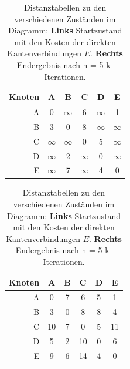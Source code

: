 \documentclass[12pt]{article}
\begin{document}
\begin{table}
\begin{tabular}{r||c|c|c|c|c}
	Knoten&A&B&C&D&E\\ \hline \hline
	A&0&$\infty$&6&$\infty$&1\\
	B&3&0&8&$\infty$&$\infty$\\
	C&$\infty$&$\infty$&0&5&$\infty$\\
	D&$\infty$&2&$\infty$&0&$\infty$\\
	E&$\infty$&7&$\infty$&4&0\\
\end{tabular}
\hspace*{20pt}
\begin{tabular}{r||c|c|c|c|c}
	Knoten&A&B&C&D&E\\ \hline \hline
	A&0&7&6&5&1\\
	B&3&0&8&8&4\\
	C&10&7&0&5&11\\
	D&5&2&10&0&6\\
	E&9&6&14&4&0\\
\end{tabular}
\caption{Distanztabellen zu den verschiedenen Zuständen im Diagramm: \textbf{Links} Startzustand mit den Kosten der direkten Kantenverbindungen $E$. \textbf{Rechts} Endergebnis nach n = 5 k-Iterationen.}
\label{tab:floyd_start}
\end{table}
\end{document}
